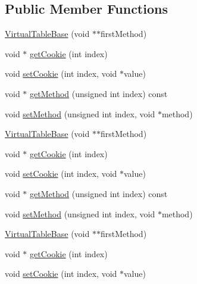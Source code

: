 \subsection*{Public Member Functions}
\begin{DoxyCompactItemize}
\item 
\mbox{\hyperlink{structfakeit_1_1VirtualTableBase_a29219a58bbe09da749b35289469ef886}{Virtual\+Table\+Base}} (void $\ast$$\ast$first\+Method)
\item 
void $\ast$ \mbox{\hyperlink{structfakeit_1_1VirtualTableBase_a10a40c78e7e76a1d7186e2793abd0821}{get\+Cookie}} (int index)
\item 
void \mbox{\hyperlink{structfakeit_1_1VirtualTableBase_a88c0ad603268ec3f250c20aea730e23c}{set\+Cookie}} (int index, void $\ast$value)
\item 
void $\ast$ \mbox{\hyperlink{structfakeit_1_1VirtualTableBase_a54b22562832757fe151a9b8d0e46c26d}{get\+Method}} (unsigned int index) const
\item 
void \mbox{\hyperlink{structfakeit_1_1VirtualTableBase_aa1996cddf28f78a50b87cbeff072ff06}{set\+Method}} (unsigned int index, void $\ast$method)
\item 
\mbox{\hyperlink{structfakeit_1_1VirtualTableBase_a29219a58bbe09da749b35289469ef886}{Virtual\+Table\+Base}} (void $\ast$$\ast$first\+Method)
\item 
void $\ast$ \mbox{\hyperlink{structfakeit_1_1VirtualTableBase_a10a40c78e7e76a1d7186e2793abd0821}{get\+Cookie}} (int index)
\item 
void \mbox{\hyperlink{structfakeit_1_1VirtualTableBase_a88c0ad603268ec3f250c20aea730e23c}{set\+Cookie}} (int index, void $\ast$value)
\item 
void $\ast$ \mbox{\hyperlink{structfakeit_1_1VirtualTableBase_a54b22562832757fe151a9b8d0e46c26d}{get\+Method}} (unsigned int index) const
\item 
void \mbox{\hyperlink{structfakeit_1_1VirtualTableBase_aa1996cddf28f78a50b87cbeff072ff06}{set\+Method}} (unsigned int index, void $\ast$method)
\item 
\mbox{\hyperlink{structfakeit_1_1VirtualTableBase_a29219a58bbe09da749b35289469ef886}{Virtual\+Table\+Base}} (void $\ast$$\ast$first\+Method)
\item 
void $\ast$ \mbox{\hyperlink{structfakeit_1_1VirtualTableBase_a10a40c78e7e76a1d7186e2793abd0821}{get\+Cookie}} (int index)
\item 
void \mbox{\hyperlink{structfakeit_1_1VirtualTableBase_a88c0ad603268ec3f250c20aea730e23c}{set\+Cookie}} (int index, void $\ast$value)
$$
\end{DoxyCompactItemize}
